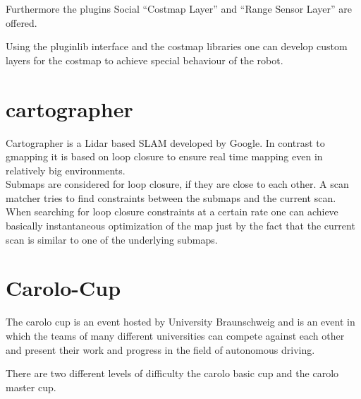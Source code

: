 Furthermore the plugins Social ``Costmap Layer'' and ``Range Sensor Layer'' are offered.

Using the pluginlib interface and the costmap libraries one can develop custom layers for the costmap to achieve special behaviour of the robot.



\section{cartographer}
Cartographer is a Lidar based SLAM developed by Google. In contrast to gmapping it is based on loop closure to ensure real time mapping even in relatively big environments.\\
Submaps are considered for loop closure, if they are close to each other. A scan matcher tries to find constraints between the submaps and the current scan. When searching for loop closure constraints at a certain rate one can achieve basically instantaneous optimization of the map just by the fact that the current scan is similar to one of the underlying submaps\cite{cartographer}.\\

\section{Carolo-Cup}
The carolo cup is an event hosted by University Braunschweig and is an event in which the teams of many different universities can compete against each other and present their work and progress in the field of autonomous driving.

There are two different levels of difficulty the carolo basic cup and the carolo master cup.













